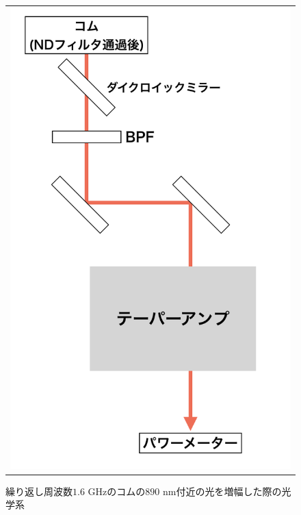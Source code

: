 \documentclass[uplatex, dvipdfmx, a4paper, report, papersize, 11pt]{jsbook}
\begin{document}
\begin{figure}[H]
  \centering
    \begin{tabular}{c}
      \begin{minipage}{1\hsize}
        \centering
          \includegraphics[keepaspectratio,  scale=0.4,  angle=0]
          {figures/chapter4/890_astro_amp_diagram.png}
          \caption{繰り返し周波数$1.6$ GHzのコムの$890$ nm付近の光を増幅した際の光学系}
          \label{890_astro_amp_diagram}
      \end{minipage}
    \end{tabular}
\end{figure}
\end{document}
